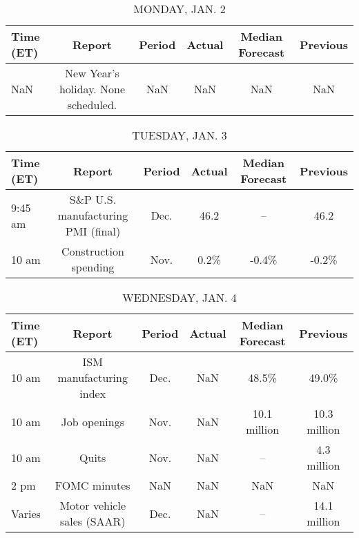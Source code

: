 \documentclass{article}%
\begin{document}
%
\normalsize%


\begin{table}[htbp]%
\caption{MONDAY, JAN. 2}%
\centering%
\begin{adjustbox}{width=1\textwidth}%
\begin{tabular}{lccccc}
\toprule
Time (ET) &                              Report & Period & Actual & Median Forecast & Previous \\
\midrule
      NaN & New Year's holiday. None scheduled. &    NaN &    NaN &             NaN &      NaN \\
\bottomrule
\end{tabular}
%
\end{adjustbox}%
\end{table}

%


\begin{table}[htbp]%
\caption{TUESDAY, JAN. 3}%
\centering%
\begin{adjustbox}{width=1\textwidth}%
\begin{tabular}{lccccc}
\toprule
Time (ET) &                             Report & Period & Actual & Median Forecast & Previous \\
\midrule
  9:45 am & S\&P U.S. manufacturing PMI (final) &   Dec. &   46.2 &              -- &     46.2 \\
    10 am &              Construction spending &   Nov. &   0.2\% &           -0.4\% &    -0.2\% \\
\bottomrule
\end{tabular}
%
\end{adjustbox}%
\end{table}

%


\begin{table}[htbp]%
\caption{WEDNESDAY, JAN. 4}%
\centering%
\begin{adjustbox}{width=1\textwidth}%
\begin{tabular}{lccccc}
\toprule
Time (ET) &                     Report & Period & Actual & Median Forecast &     Previous \\
\midrule
    10 am &    ISM manufacturing index &   Dec. &    NaN &           48.5\% &        49.0\% \\
    10 am &               Job openings &   Nov. &    NaN &    10.1 million & 10.3 million \\
    10 am &                      Quits &   Nov. &    NaN &              -- &  4.3 million \\
     2 pm &               FOMC minutes &    NaN &    NaN &             NaN &          NaN \\
   Varies & Motor vehicle sales (SAAR) &   Dec. &    NaN &              -- & 14.1 million \\
\bottomrule
\end{tabular}
%
\end{adjustbox}%
\end{table}
\end{document}
